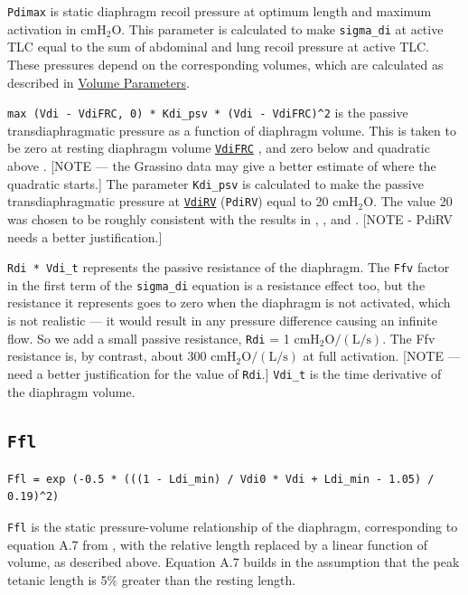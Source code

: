 \documentclass[12pt,openany,oneside]{book}
\begin{document}
\verb~Pdimax~ is static diaphragm recoil pressure at
optimum length and maximum activation in $\mathrm{cmH_2O}$. This parameter is
calculated to make \verb~sigma_di~ at active TLC equal to the sum of
abdominal and lung recoil pressure at active TLC. These pressures
depend on the corresponding volumes, which are calculated as
described in \hyperref[Volume Parameters]{Volume Parameters}.

\verb~max (Vdi - VdiFRC, 0) * Kdi_psv * (Vdi - VdiFRC)^2~ 
is the
passive transdiaphragmatic pressure as a function of diaphragm volume.
This is taken to be zero at resting diaphragm volume
\hyperref[Volume Parameters]{\texttt{VdiFRC}}
\citep{Agostoni01111960}, and zero below and quadratic above
\citep{Reid01091987}. [NOTE --- the Grassino data may give a better
estimate of where the quadratic starts.]  The parameter \verb~Kdi_psv~
is calculated to make the passive transdiaphragmatic pressure at
\hyperref[Volume Parameters]{\texttt{VdiRV}} (\verb~PdiRV~) equal to
20 $\mathrm{cmH_2O}$. The value 20 was chosen to be roughly
consistent with the results in \citet{Siafakas01071979},
\citet{Grassino01061978}, and \citet{Agostoni01011966}. [NOTE -
PdiRV needs a better justification.]

\verb~Rdi * Vdi_t~ represents the passive resistance of the diaphragm.
The \verb~Ffv~ factor in the first term of the \verb~sigma_di~
equation is a resistance effect too, but the resistance it represents
goes to zero when the diaphragm is not activated, which is not
realistic --- it would result in any pressure difference causing an
infinite flow. So we add a small passive resistance, \verb~Rdi~ = 1
$\mathrm{cmH_2O/(L/s)}$. The Ffv resistance is, by contrast, about
300 $\mathrm{cmH_2O/(L/s)}$ at full activation. [NOTE --- need a better
justification for the value of \verb~Rdi~.]  \verb~Vdi_t~ is the time
derivative of the diaphragm volume.

\subsection{\texttt{Ffl}}
\begin{verbatim}
Ffl = exp (-0.5 * (((1 - Ldi_min) / Vdi0 * Vdi + Ldi_min - 1.05) / 0.19)^2)
\end{verbatim}
\verb~Ffl~ is the static pressure-volume relationship of the
diaphragm, corresponding to equation A.7 from
\citet{Ratnovsky20031771}, with the relative length replaced by a
linear function of volume, as described above. Equation A.7 builds in
the assumption that the peak tetanic length is 5\% greater than the
resting length.
\end{document}

